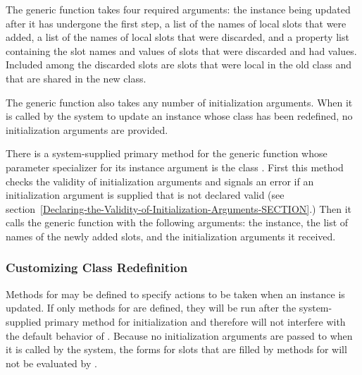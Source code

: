 The generic function  takes
four required arguments: the instance being updated after it has
undergone the first step, a list of the names of local slots that were
added, a list of the names of local slots that were discarded, and a
property list containing the slot names and values of slots that were
discarded and had values.  Included among the discarded slots are
slots that were local in the old class and that are shared in the new
class.

The generic function  also
takes any number of initialization arguments.  When it is called by
the system to update an instance whose class has been redefined, no
initialization arguments are provided.

There is a system-supplied primary method for the generic function
 whose parameter specializer for
its instance argument is the class .  First this
method checks the validity of initialization arguments and signals an
error if an initialization argument is supplied that is not declared
valid (see
section~\ref{Declaring-the-Validity-of-Initialization-Arguments-SECTION}.)
Then it calls the generic function
 with the following arguments: the instance,
the list of names of the newly added slots, and the initialization
arguments it received.


\subsubsection{Customizing Class Redefinition}

Methods for  may be defined
to specify actions to be taken when an instance is updated.  If only
 methods for  are
defined, they will be run after the system-supplied primary method for
initialization and therefore will not interfere with the default
behavior of .  Because no
initialization arguments are passed to 
 when it is called by the system,
the  forms for slots that are filled by 
methods for  will not be
evaluated by .

